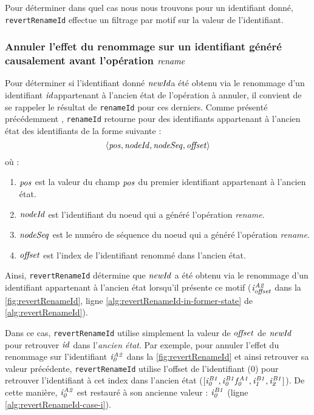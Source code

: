 Pour déterminer dans quel cas nous nous trouvons pour un identifiant donné, \texttt{revertRenameId} effectue un filtrage par motif sur la valeur de l'identifiant.

\subsubsection{Annuler l'effet du renommage sur un identifiant généré causalement avant l'opération $\mathit{rename}$}

\label{sec:reverting-rename-ops-id-in-former-state}

Pour déterminer si l'identifiant donné $\mathit{newId}$\footnotemark a été obtenu via le renommage d'un identifiant $\mathit{id}$\footnotemark[\value{footnote}] appartenant à l'ancien état de l'opération à annuler, il convient de se rappeler le résultat de \texttt{renameId} pour ces derniers.
Comme présenté précédemment , \texttt{renameId} retourne pour des identifiants appartenant à l'ancien état des identifiants de la forme suivante :
\[ \langle \mathit{pos},\mathit{nodeId},\mathit{nodeSeq},\mathit{offset} \rangle \]
où :
\begin{enumerate}
    \item $\mathit{pos}$ est la valeur du champ $\mathit{pos}$ du premier identifiant appartenant à l'ancien état.
    \item $\mathit{nodeId}$ est l'identifiant du noeud qui a généré l'opération \emph{rename}.
    \item $\mathit{nodeSeq}$ est le numéro de séquence du noeud qui a généré l'opération \emph{rename}.
    \item $\mathit{offset}$ est l'index de l'identifiant renommé dans l'ancien état.
\end{enumerate}
Ainsi, \texttt{revertRenameId} détermine que $\mathit{newId}$ a été obtenu via le renommage d'un identifiant appartenant à l'ancien état lorsqu'il présente ce motif ($\mathit{i}^{\mathit{A2}}_{\mathit{offset}}$ dans la \autoref{fig:revertRenameId}, ligne \ref{alg:revertRenameId-in-former-state} de \autoref{alg:revertRenameId}).

Dans ce cas, \texttt{revertRenameId} utilise simplement la valeur de $\mathit{offset}$ de $\mathit{newId}$ pour retrouver $\mathit{id}$ dans l'\emph{ancien état}.
Par exemple, pour annuler l'effet du renommage sur l'identifiant $\mathit{i}^{\mathit{A2}}_{\mathit{0}}$ dans la \autoref{fig:revertRenameId} et ainsi retrouver sa valeur précédente, \texttt{revertRenameId} utilise l'offset de l'identifiant (0) pour retrouver l'identifiant à cet index dans l'ancien état ($[\mathit{i}^{\mathit{B1}}_{\mathit{0}},\mathit{i}^{\mathit{B1}}_{\mathit{0}}\mathit{f}^{\mathit{A1}}_{\mathit{0}},\mathit{i}^{\mathit{B1}}_{\mathit{1}},\mathit{i}^{\mathit{B1}}_{\mathit{2}}]$).
De cette manière, $\mathit{i}^{\mathit{A2}}_{\mathit{0}}$ est restauré à son ancienne valeur : $\mathit{i}^{\mathit{B1}}_{\mathit{0}}$ (ligne \ref{alg:revertRenameId-case-i}).

